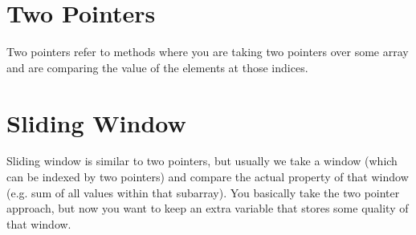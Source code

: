 \documentclass{article}
\begin{document}
\section{Two Pointers}

  Two pointers refer to methods where you are taking two pointers over some array and are comparing the value of the elements at those indices.  

\section{Sliding Window}
  
  Sliding window is similar to two pointers, but usually we take a window (which can be indexed by two pointers) and compare the actual property of that window (e.g. sum of all values within that subarray). You basically take the two pointer approach, but now you want to keep an extra variable that stores some quality of that window. 
\end{document}
